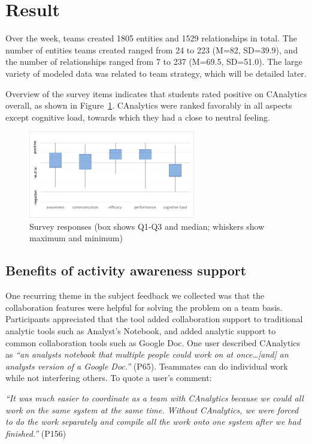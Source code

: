 \section{Result}\label{result}

Over the week, teams created 1805 entities and 1529 relationships in
total. The number of entities teams created ranged from 24 to 223 (M=82,
SD=39.9), and the number of relationships ranged from 7 to 237 (M=69.5,
SD=51.0). The large variety of modeled data was related to team
strategy, which will be detailed later.

Overview of the survey items indicates that students rated positive on
CAnalytics overall, as shown in Figure~\ref{fig:survey}. CAnalytics were ranked
favorably in all aspects except cognitive load, towards which they had a close
to neutral feeling.

\begin{figure}
\centering
\includegraphics[height=1.5in]{./img/survey_boxchart.jpg}
\caption{Survey responses (box shows Q1-Q3 and median; whiskers show
maximum and minimum)}\label{fig:survey}
\end{figure}

\subsection{Benefits of activity awareness support}\label{benefits-of-activity-awareness-support}

One recurring theme in the subject feedback we collected was that the
collaboration features were helpful for solving the problem on a team basis.
Participants appreciated that the tool added collaboration support to
traditional analytic tools such as Analyst's Notebook, and added analytic
support to common collaboration tools such as Google Doc. One user described
CAnalytics as \emph{``an analysts notebook that multiple people could work on at
once\ldots{}{[}and{]} an analysts version of a Google Doc.''} (P65). Teammates can do individual work while not interfering others. To quote a user's comment:

\emph{``It was much easier to coordinate as a team with CAnalytics because we
could all work on the same system at the same time. Without CAnalytics, we were
forced to do the work separately and compile all the work onto one system after
we had finished.''} (P156)

